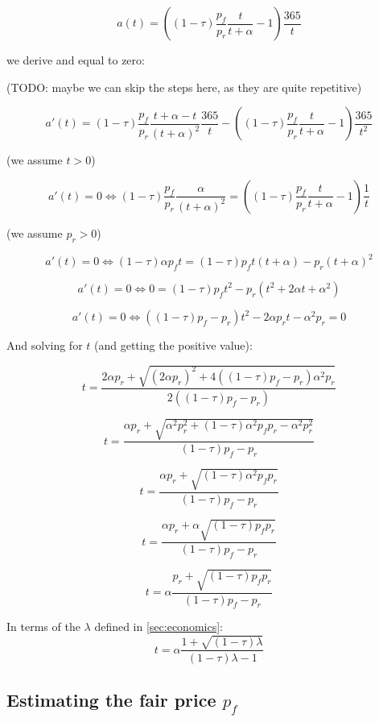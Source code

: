 \documentclass{article}
\begin{document}
\begin{equation}
  \label{eq:apr}
a(t) = \left((1-\tau)\frac{p_f}{p_r} \frac{t}{t+\alpha} - 1\right) \frac{365}{t}
\end{equation}

we derive and equal to zero:

(TODO: maybe we can skip the steps here, as they are quite repetitive)

\[
a'(t) = (1-\tau)\frac{p_f}{p_r} \frac{t + \alpha - t}{(t+\alpha)^2} \frac{365}{t} - \left((1-\tau)\frac{p_f}{p_r} \frac{t}{t+\alpha} - 1\right) \frac{365}{t^2}
\]

(we assume $t > 0$)

\[
a'(t) = 0 \iff (1-\tau)\frac{p_f}{p_r} \frac{\alpha}{(t+\alpha)^2} = \left((1-\tau)\frac{p_f}{p_r} \frac{t}{t+\alpha} - 1\right) \frac{1}{t}
\]

(we assume $p_r > 0$)

\[
a'(t) = 0 \iff (1-\tau) \alpha p_f t = (1-\tau) p_f t(t+\alpha)  - p_r(t+\alpha)^2
\]

\[
a'(t) = 0 \iff 0 = (1-\tau)p_f t^2 - p_r(t^2+2\alpha t+\alpha^2)
\]

\[
a'(t) = 0 \iff ((1-\tau)p_f-p_r)t^2  - 2\alpha p_r t - \alpha^2 p_r = 0
\]

And solving for $t$ (and getting the positive value):

\[
t = \frac{2\alpha p_r + \sqrt{(2\alpha p_r)^2 + 4((1-\tau)p_f-p_r) \alpha^2 p_r}}{2((1-\tau)p_f-p_r)}
\]

\[
t = \frac{\alpha p_r + \sqrt{\alpha^2 p_r^2 + (1-\tau) \alpha^2 p_f p_r- \alpha^2 p_r^2}}{(1-\tau)p_f-p_r}
\]

\[
t = \frac{\alpha p_r + \sqrt{(1-\tau) \alpha^2 p_f p_r}}{(1-\tau)p_f-p_r}
\]

\[
t = \frac{\alpha p_r + \alpha \sqrt{(1-\tau)p_f p_r}}{(1-\tau)p_f-p_r}
\]

\begin{equation}
  \label{eq:optimal_chicken_in_1_tax}
t = \alpha \frac{p_r + \sqrt{(1-\tau)p_f p_r}}{(1-\tau)p_f-p_r}
\end{equation}

In terms of the $\lambda$ defined in \ref{sec:economics}:
\begin{equation}
  \label{eq:optimal_chicken_in_2_tax}
t = \alpha \frac{1 + \sqrt{(1-\tau)\lambda}}{(1-\tau)\lambda - 1}
\end{equation}

\subsection{Estimating the fair price $p_f$}
\end{document}
